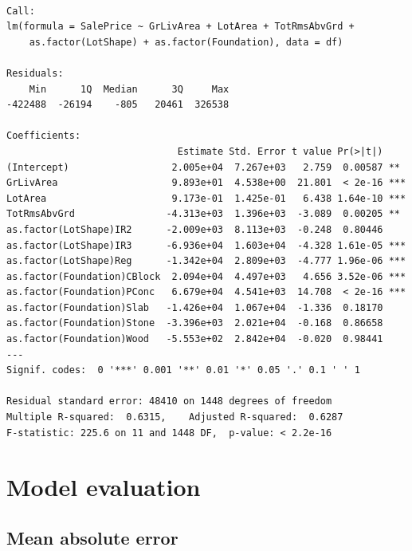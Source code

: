 \documentclass[
  letterpaper,
  DIV=11,
  numbers=noendperiod]{scrreprt}
\newenvironment{Shaded}{\begin{snugshade}}{\end{snugshade}}
\newcommand{\FunctionTok}[1]{\textcolor[rgb]{0.28,0.35,0.67}{#1}}
\newcommand{\NormalTok}[1]{\textcolor[rgb]{0.00,0.23,0.31}{#1}}
\newcommand{\OtherTok}[1]{\textcolor[rgb]{0.00,0.23,0.31}{#1}}
\newcommand{\SpecialCharTok}[1]{\textcolor[rgb]{0.37,0.37,0.37}{#1}}
\begin{document}
\begin{verbatim}

Call:
lm(formula = SalePrice ~ GrLivArea + LotArea + TotRmsAbvGrd + 
    as.factor(LotShape) + as.factor(Foundation), data = df)

Residuals:
    Min      1Q  Median      3Q     Max 
-422488  -26194    -805   20461  326538 

Coefficients:
                              Estimate Std. Error t value Pr(>|t|)    
(Intercept)                  2.005e+04  7.267e+03   2.759  0.00587 ** 
GrLivArea                    9.893e+01  4.538e+00  21.801  < 2e-16 ***
LotArea                      9.173e-01  1.425e-01   6.438 1.64e-10 ***
TotRmsAbvGrd                -4.313e+03  1.396e+03  -3.089  0.00205 ** 
as.factor(LotShape)IR2      -2.009e+03  8.113e+03  -0.248  0.80446    
as.factor(LotShape)IR3      -6.936e+04  1.603e+04  -4.328 1.61e-05 ***
as.factor(LotShape)Reg      -1.342e+04  2.809e+03  -4.777 1.96e-06 ***
as.factor(Foundation)CBlock  2.094e+04  4.497e+03   4.656 3.52e-06 ***
as.factor(Foundation)PConc   6.679e+04  4.541e+03  14.708  < 2e-16 ***
as.factor(Foundation)Slab   -1.426e+04  1.067e+04  -1.336  0.18170    
as.factor(Foundation)Stone  -3.396e+03  2.021e+04  -0.168  0.86658    
as.factor(Foundation)Wood   -5.553e+02  2.842e+04  -0.020  0.98441    
---
Signif. codes:  0 '***' 0.001 '**' 0.01 '*' 0.05 '.' 0.1 ' ' 1

Residual standard error: 48410 on 1448 degrees of freedom
Multiple R-squared:  0.6315,    Adjusted R-squared:  0.6287 
F-statistic: 225.6 on 11 and 1448 DF,  p-value: < 2.2e-16
\end{verbatim}

\hypertarget{model-evaluation}{%
\section{Model evaluation}\label{model-evaluation}}

\hypertarget{mean-absolute-error-1}{%
\subsection{Mean absolute error}\label{mean-absolute-error-1}}

\begin{Shaded}
\end{Shaded}
\end{document}
